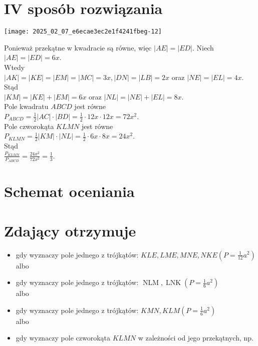 \documentclass[10pt]{article}
\begin{document}
\section*{IV sposób rozwiązania}
\begin{center}
\texttt{[image: 2025\_02\_07\_e6ecae3ec2e1f4241fbeg-12]}
\end{center}

Ponieważ przekątne w kwadracie są równe, więc $|A E|=|E D|$. Niech $|A E|=|E D|=6 x$.\\
Wtedy\\
$|A K|=|K E|=|E M|=|M C|=3 x,|D N|=|L B|=2 x$ oraz $|N E|=|E L|=4 x$.\\
Stąd\\
$|K M|=|K E|+|E M|=6 x$ oraz $|N L|=|N E|+|E L|=8 x$.\\
Pole kwadratu $A B C D$ jest równe\\
$P_{A B C D}=\frac{1}{2}|A C| \cdot|B D|=\frac{1}{2} \cdot 12 x \cdot 12 x=72 x^{2}$.\\
Pole czworokąta $K L M N$ jest równe\\
$P_{K L M N}=\frac{1}{2}|K M| \cdot|N L|=\frac{1}{2} \cdot 6 x \cdot 8 x=24 x^{2}$.\\
Stąd\\
$\frac{P_{K L M N}}{P_{A B C D}}=\frac{24 x^{2}}{72 x^{2}}=\frac{1}{3}$.

\section*{Schemat oceniania}
\section*{Zdający otrzymuje}
\begin{itemize}
  \item gdy wyznaczy pole jednego z trójkątów: $K L E, L M E, M N E, N K E\left(P=\frac{1}{12} a^{2}\right)$\\
albo
  \item gdy wyznaczy pole jednego z trójkątów: $\operatorname{NLM}, \operatorname{LNK}\left(P=\frac{1}{6} a^{2}\right)$\\
albo
  \item gdy wyznaczy pole jednego z trójkątów: $K M N, K L M\left(P=\frac{1}{6} a^{2}\right)$\\
albo
  \item gdy wyznaczy pole czworokąta $K L M N$ w zależności od jego przekątnych, np.
\end{itemize}
\end{document}
